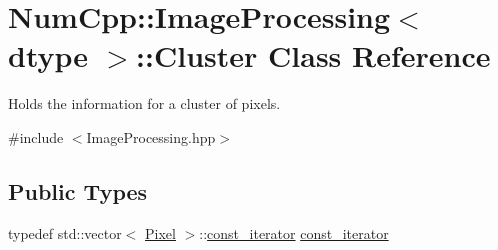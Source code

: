 \hypertarget{class_num_cpp_1_1_image_processing_1_1_cluster}{}\section{Num\+Cpp\+:\+:Image\+Processing$<$ dtype $>$\+:\+:Cluster Class Reference}
\label{class_num_cpp_1_1_image_processing_1_1_cluster}


Holds the information for a cluster of pixels.  




{\ttfamily \#include $<$Image\+Processing.\+hpp$>$}

\subsection*{Public Types}
\begin{DoxyCompactItemize}
\item 
typedef std\+::vector$<$ \mbox{\hyperlink{class_num_cpp_1_1_image_processing_1_1_pixel}{Pixel}} $>$\+::\mbox{\hyperlink{class_num_cpp_1_1_image_processing_1_1_cluster_a8f26defce53112d60fd1a178b5669ce6}{const\+\_\+iterator}} \mbox{\hyperlink{class_num_cpp_1_1_image_processing_1_1_cluster_a8f26defce53112d60fd1a178b5669ce6}{const\+\_\+iterator}}
\end{DoxyCompactItemize}
